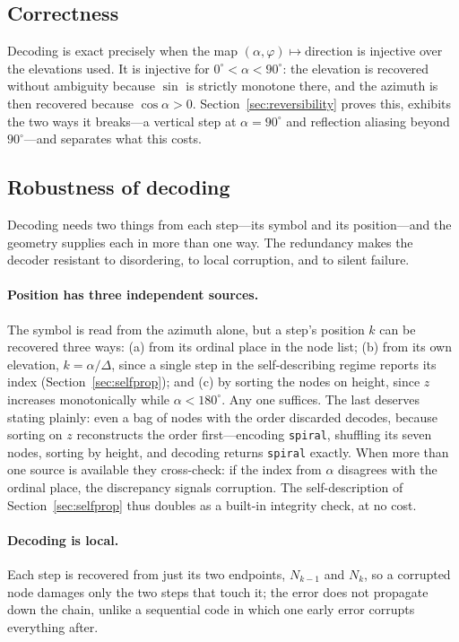 \documentclass[11pt]{article}
\renewcommand{\deg}{^{\circ}}  %
\begin{document}
\subsection{Correctness}

Decoding is exact precisely when the map $(\alpha,\varphi)\mapsto\text{direction}$ is
injective over the elevations used. It is injective for $0\deg<\alpha<90\deg$: the elevation
is recovered without ambiguity because $\sin$ is strictly monotone there, and the azimuth is
then recovered because $\cos\alpha>0$. Section~\ref{sec:reversibility} proves this, exhibits
the two ways it breaks---a vertical step at $\alpha=90\deg$ and reflection aliasing beyond
$90\deg$---and separates what this costs.

\subsection{Robustness of decoding}

Decoding needs two things from each step---its symbol and its position---and the geometry
supplies each in more than one way. The redundancy makes the decoder resistant to
disordering, to local corruption, and to silent failure.

\paragraph{Position has three independent sources.} The symbol is read from the azimuth
alone, but a step's position $k$ can be recovered three ways: (a) from its ordinal place in
the node list; (b) from its own elevation, $k=\alpha/\Delta$, since a single step in the
self-describing regime reports its index (Section~\ref{sec:selfprop}); and (c) by sorting the
nodes on height, since $z$ increases monotonically while $\alpha<180\deg$. Any one suffices.
The last deserves stating plainly: even a bag of nodes with the order discarded decodes,
because sorting on $z$ reconstructs the order first---encoding \texttt{spiral}, shuffling its
seven nodes, sorting by height, and decoding returns \texttt{spiral} exactly. When more than
one source is available they cross-check: if the index from $\alpha$ disagrees with the
ordinal place, the discrepancy signals corruption. The self-description of
Section~\ref{sec:selfprop} thus doubles as a built-in integrity check, at no cost.

\paragraph{Decoding is local.} Each step is recovered from just its two endpoints, $N_{k-1}$
and $N_k$, so a corrupted node damages only the two steps that touch it; the error does not
propagate down the chain, unlike a sequential code in which one early error corrupts
everything after.
\end{document}
